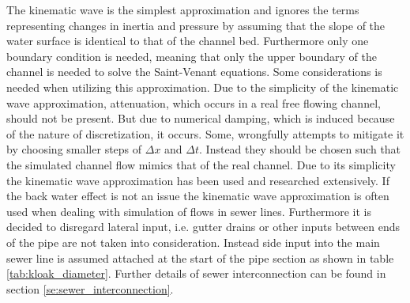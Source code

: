The kinematic wave is the simplest approximation and ignores the terms representing changes in inertia and pressure by assuming that the slope of the water surface is identical to that of the channel bed. Furthermore only one boundary condition is needed, meaning that only the upper boundary of the channel is needed to solve the Saint-Venant equations.  
Some considerations is needed when utilizing this approximation.      
Due to the simplicity of the kinematic wave approximation, attenuation, which occurs in a real free flowing channel, should not be present. But due to numerical damping, which is induced because of the nature of discretization, it occurs. Some, wrongfully attempts to mitigate it by choosing smaller steps of $\Delta x$ and $\Delta t$. Instead they should be chosen such that the simulated channel flow mimics that of the real channel.
Due to its simplicity the kinematic wave approximation has been used and researched extensively. If the back water effect is not an issue the kinematic wave approximation is often used when dealing with simulation of flows in sewer lines. Furthermore it is decided to disregard lateral input, i.e. gutter drains or other inputs between ends of the pipe are not taken into consideration. 
Instead side input into the main sewer line is assumed attached at the start of the pipe section as shown in table \ref{tab:kloak_diameter}. Further details of sewer interconnection can be found in section \ref{se:sewer_interconnection}. 







